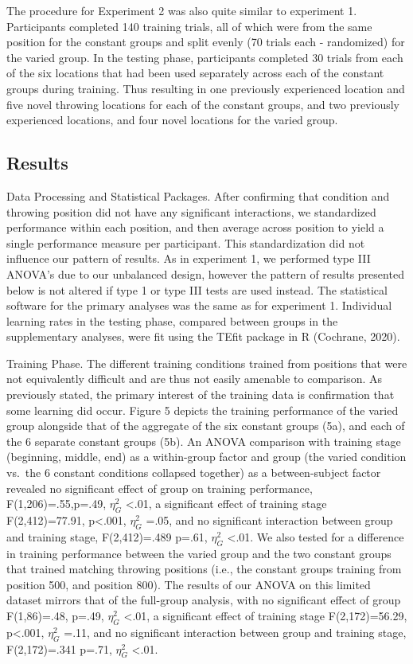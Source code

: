\documentclass[
  man,floatsintext]{apa7}
\begin{document}
The procedure for Experiment 2 was also quite similar to experiment 1. Participants completed 140 training trials, all of which were from the same position for the constant groups and split evenly (70 trials each - randomized) for the varied group. In the testing phase, participants completed 30 trials from each of the six locations that had been used separately across each of the constant groups during training. Thus resulting in one previously experienced location and five novel throwing locations for each of the constant groups, and two previously experienced locations, and four novel locations for the varied group.

\hypertarget{results-1}{%
\subsection{Results}\label{results-1}}

Data Processing and Statistical Packages. After confirming that condition and throwing position did not have any significant interactions, we standardized performance within each position, and then average across position to yield a single performance measure per participant. This standardization did not influence our pattern of results. As in experiment 1, we performed type III ANOVA's due to our unbalanced design, however the pattern of results presented below is not altered if type 1 or type III tests are used instead. The statistical software for the primary analyses was the same as for experiment 1. Individual learning rates in the testing phase, compared between groups in the supplementary analyses, were fit using the TEfit package in R (Cochrane, 2020).

Training Phase. The different training conditions trained from positions that were not equivalently difficult and are thus not easily amenable to comparison. As previously stated, the primary interest of the training data is confirmation that some learning did occur. Figure 5 depicts the training performance of the varied group alongside that of the aggregate of the six constant groups (5a), and each of the 6 separate constant groups (5b). An ANOVA comparison with training stage (beginning, middle, end) as a within-group factor and group (the varied condition vs.~the 6 constant conditions collapsed together) as a between-subject factor revealed no significant effect of group on training performance, F(1,206)=.55,p=.49, \(\eta^{2}_G\) \textless.01, a significant effect of training stage F(2,412)=77.91, p\textless.001, \(\eta^{2}_G\) =.05, and no significant interaction between group and training stage, F(2,412)=.489 p=.61, \(\eta^{2}_G\) \textless.01. We also tested for a difference in training performance between the varied group and the two constant groups that trained matching throwing positions (i.e., the constant groups training from position 500, and position 800). The results of our ANOVA on this limited dataset mirrors that of the full-group analysis, with no significant effect of group F(1,86)=.48, p=.49, \(\eta^{2}_G\) \textless.01, a significant effect of training stage F(2,172)=56.29, p\textless.001, \(\eta^{2}_G\) =.11, and no significant interaction between group and training stage, F(2,172)=.341 p=.71, \(\eta^{2}_G\) \textless.01.
\end{document}
